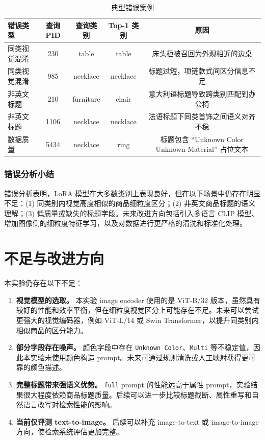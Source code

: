 \documentclass[11pt, a4paper]{ctexart}
\begin{document}
\begin{table}[!htbp]
    \centering
    \caption{典型错误案例}
    \label{tab:error-examples}
    \footnotesize
    \begin{tabular}{>{\raggedright\arraybackslash}p{2.2cm}cccc}
        \toprule
        \textbf{错误类型} & \textbf{查询 PID} & \textbf{查询类别} & \textbf{Top-1 类别} & \textbf{原因} \\
        \midrule
        同类视觉混淆 & 230 & table & table & 床头柜被召回为外观相近的边桌 \\
        同类视觉混淆 & 985 & necklace & necklace & 标题过短，项链款式间区分信息不足 \\
        非英文标题 & 210 & furniture & chair & 意大利语标题导致跨类别匹配到办公椅 \\
        非英文标题 & 1106 & necklace & necklace & 法语标题下同类首饰之间语义对齐不稳 \\
        数据质量 & 5434 & necklace & ring & 标题包含 ``Unknown Color Unknown Material'' 占位文本 \\
        \bottomrule
    \end{tabular}
\end{table}
\FloatBarrier

\subsubsection*{错误分析小结}

错误分析表明，LoRA 模型在大多数类别上表现良好，但在以下场景中仍存在明显不足：(1) 同类别内视觉高度相似的商品细粒度区分；(2) 非英文商品标题的语义理解；(3) 低质量或缺失的标题字段。未来改进方向包括引入多语言 CLIP 模型、增加图像侧的细粒度特征学习，以及对数据进行更严格的清洗和标准化处理。

\section{不足与改进方向}

本实验仍存在以下不足：
\begin{enumerate}[leftmargin=2em, itemsep=0pt]
    \item \textbf{视觉模型的选取。} 本实验 image encoder 使用的是 ViT-B/32 版本，虽然具有较好的性能和效率平衡，但在细粒度视觉区分上可能存在不足。未来可以尝试更强大的视觉编码器，例如 ViT-L/14 或 Swin Transformer，以提升同类别内相似商品的区分能力。
    \item \textbf{部分字段存在噪声。} 颜色字段中存在 \texttt{Unknown Color}、\texttt{Multi} 等不稳定值，因此本实验未使用颜色构造 prompt。未来可通过规则清洗或人工映射获得更可靠的颜色描述。
    \item \textbf{完整标题带来强语义优势。} \texttt{full} prompt 的性能远高于属性 prompt，实验结果很大程度依赖商品标题质量。后续可以进一步比较标题截断、属性重写和自然语言改写对检索性能的影响。
    \item \textbf{当前仅评测 text-to-image。} 后续可以补充 image-to-text 或 image-to-image 方向，使检索系统评估更加完整。
\end{enumerate}
\end{document}
